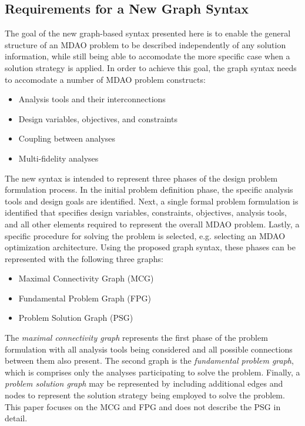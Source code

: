 \subsection{Requirements for a New Graph Syntax}
  \label{s:requirements}
  The goal of the new graph-based syntax presented here is to enable the general 
  structure of an MDAO problem to be described independently of any solution information, 
  while still being able to accomodate the more specific case when a solution 
  strategy is applied. In order to achieve this goal, 
  the graph syntax needs to accomodate a number of MDAO problem constructs: 
  \begin{itemize}
    \item Analysis tools and their interconnections
    \item Design variables, objectives, and constraints
    \item Coupling between analyses
    \item Multi-fidelity analyses
  \end{itemize}

  The new syntax is intended to represent three phases of the design problem 
  formulation process. In the initial problem definition phase, the specific 
  analysis tools and design goals are identified. Next, a single formal problem 
  formulation is identified that specifies design variables, constraints, 
  objectives, analysis tools, and all other elements required to represent 
  the overall MDAO problem. Lastly, a specific procedure for solving the problem 
  is selected, e.g. selecting an MDAO optimization architecture. Using 
  the proposed graph syntax, these phases can be represented with the following 
  three graphs:
  \begin{itemize}
    \item Maximal Connectivity Graph (MCG)
    \item Fundamental Problem Graph (FPG)
    \item Problem Solution Graph (PSG)
  \end{itemize}

  The \emph{maximal connectivity graph} represents the first phase of the problem 
  formulation with all analysis tools being considered and all possible connections 
  between them also present. The second graph is the \emph{fundamental problem graph}, 
  which is comprises only the analyses participating to solve the problem. 
  Finally, a \emph{problem solution graph} may be represented by including additional 
  edges and nodes to represent the solution strategy being employed to solve the 
  problem. This paper focuses on the MCG and FPG and does not describe the PSG in detail.

